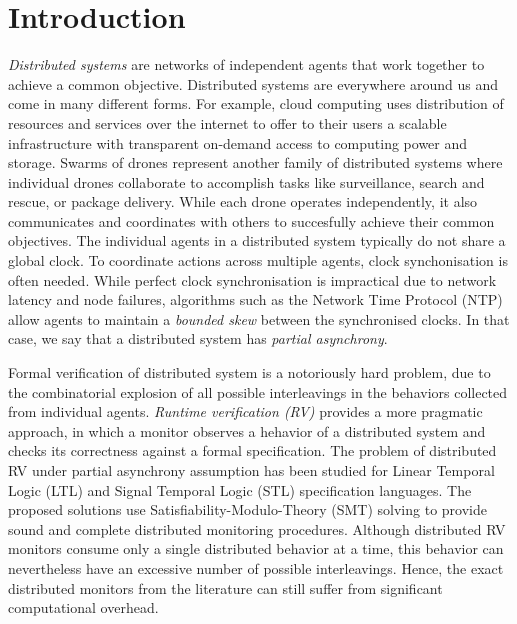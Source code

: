 \section{Introduction} \label{sec:introduction}

\emph{Distributed systems} are networks of independent agents that work together to achieve a common objective. Distributed systems are everywhere around us and come in many different forms. For example, cloud computing uses distribution of resources and services over the internet to offer to their users a scalable infrastructure with transparent on-demand access to computing power and storage. Swarms of drones represent another family of distributed systems where individual drones collaborate  to accomplish tasks like surveillance, search and rescue, or package delivery. While each drone operates independently,  it also communicates and coordinates with others to succesfully achieve their common objectives. The individual agents in a distributed system typically do not share a global clock. To coordinate actions across multiple agents, clock synchonisation is often needed. While perfect clock synchronisation is impractical due to network latency and node failures, algorithms such as the Network Time Protocol (NTP) allow agents to maintain a \emph{bounded skew} between the synchronised clocks. In that case, we say that a distributed system has \emph{partial asynchrony}. 

Formal verification of distributed system is a notoriously hard problem, due to the combinatorial explosion of all possible interleavings in the behaviors collected from individual agents. \emph{Runtime verification (RV)} provides a more pragmatic approach, in which a monitor observes a hehavior of a distributed system and checks its correctness against a formal specification. The problem of distributed RV under partial asynchrony assumption has been studied for Linear Temporal Logic (LTL) and Signal Temporal Logic (STL) specification languages. The proposed solutions use Satisfiability-Modulo-Theory (SMT) solving to provide sound and complete distributed monitoring procedures. Although distributed RV monitors consume only a single distributed behavior at a time, this behavior can nevertheless have an excessive number of possible interleavings. Hence, the exact distributed monitors from the literature can still suffer from significant computational overhead. 

